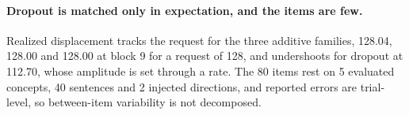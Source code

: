\paragraph{Dropout is matched only in expectation, and the items are few.}
Realized displacement tracks the request for the three additive families,
128.04, 128.00 and 128.00 at block 9 for a request of 128, and undershoots for
dropout at 112.70, whose amplitude is set through a rate. The 80 items rest on
5 evaluated concepts, 40 sentences and 2 injected directions, and reported
errors are trial-level, so between-item variability is not decomposed.
